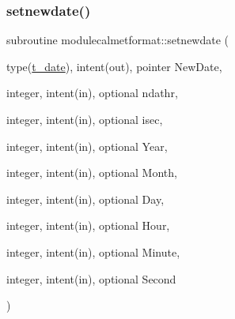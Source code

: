 \mbox{\label{namespacemodulecalmetformat_a3defaeb10661bad427bb6a70e331c077}} 
\subsubsection{\texorpdfstring{setnewdate()}{setnewdate()}}
{\footnotesize\ttfamily subroutine modulecalmetformat\+::setnewdate (\begin{DoxyParamCaption}\item[{type(\mbox{\hyperlink{structmodulecalmetformat_1_1t__date}{t\+\_\+date}}), intent(out), pointer}]{New\+Date,  }\item[{integer, intent(in), optional}]{ndathr,  }\item[{integer, intent(in), optional}]{isec,  }\item[{integer, intent(in), optional}]{Year,  }\item[{integer, intent(in), optional}]{Month,  }\item[{integer, intent(in), optional}]{Day,  }\item[{integer, intent(in), optional}]{Hour,  }\item[{integer, intent(in), optional}]{Minute,  }\item[{integer, intent(in), optional}]{Second }\end{DoxyParamCaption})\hspace{0.3cm}{\ttfamily [private]}}

